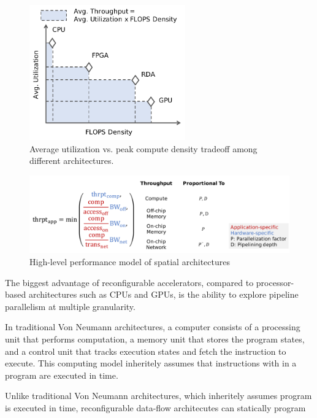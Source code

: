 \begin{figure}
\centering
\includegraphics[width=0.6\textwidth]{figs/peakutil.pdf}
\caption[Average utilization vs. peak compute density tradeoff]{
 Average utilization vs. peak compute density tradeoff among different architectures.
}
\label{fig:peakutil}
\end{figure}

\begin{figure}
\centering
\includegraphics[width=1\textwidth]{figs/perfmodel.pdf}
\caption[High-level performance model of spatial architectures]{
High-level performance model of spatial architectures
}
\label{fig:perfmodel}
\end{figure}

The biggest advantage of reconfigurable accelerators, compared to processor-based architectures 
such as CPUs and GPUs, is the ability to explore pipeline parallelism at multiple granularity. 

In traditional Von Neumann architectures, a computer consists of a processing unit that performs
computation, a memory unit that stores the program states, and a control unit that tracks execution
states and fetch the instruction to execute. This computing model inheritely assumes that
instructions with in a program are executed in time. 

Unlike traditional Von Neumann architectures, which inheritely assumes program is executed in time, 
reconfigurable data-flow architecutes can statically program 

